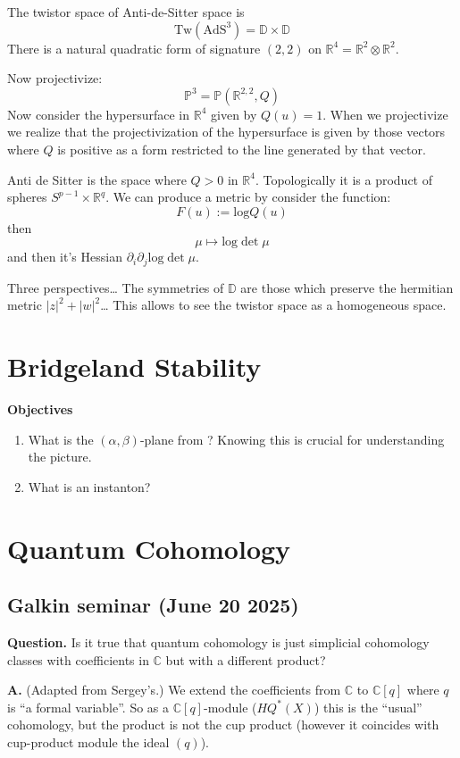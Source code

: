 The twistor space of Anti-de-Sitter space is
$$
\text{Tw}(\text{AdS}^3)=\mathbb{D}\times \mathbb{D}
$$
There is a natural quadratic form of signature $(2,2)$ on
$\mathbb{R}^4=\mathbb{R}^2 \otimes \mathbb{R}^2$. 

Now projectivize:
$$
\mathbb{P}^3=\mathbb{P}(\mathbb{R}^{2,2},Q)
$$
Now consider the hypersurface in $\mathbb{R}^4$ given by $Q(u)=1$. When we
projectivize we realize that the projectivization of the hypersurface is given
by those vectors where $Q$ is positive as a form restricted to the line
generated by that vector.

Anti de Sitter is the space where $Q>0$ in $\mathbb{R}^4$. Topologically it is a
product of spheres $S^{p-1}\times \mathbb{R}^q$. We can produce a metric by
consider the function:
$$
F(u):=\text{log}Q(u)
$$
then
$$
\mu \mapsto  \text{log}\det\mu
$$
and then it's Hessian $\partial_i \partial_j \text{log}\det \mu$.

Three perspectives… The symmetries of $\mathbb{D}$ are those which preserve the
 hermitian metric $|z|^2+|w|^2$… This allows to see the twistor space
 as a homogeneous space.

\section{Bridgeland Stability}
\label{section-Bridgeland-stability}

{\bf Objectives}
\begin{enumerate}
\item What is the $(\alpha,\beta)$-plane from \cite{wall-crossing}? Knowing this
is crucial for understanding the picture.
\item What is an instanton?
\end{enumerate}

\section{Quantum Cohomology}
\label{section-quantum-cohomology}

\subsection{Galkin seminar (June 20 2025)}
\label{subsection-Galkin-June-20}

{\bf Question.} Is it true that quantum cohomology is just simplicial cohomology
classes with coefficients in $\mathbb{C}$ but with a different product?

{\bf A.} (Adapted from Sergey's.) We extend the coefficients from $\mathbb{C}$
to $\mathbb{C}[q]$ where $q$ is ``a formal variable''. So as a
$\mathbb{C}[q]$-module ($HQ^*(X)$) this is the ``usual'' cohomology, but the
product is not the cup product (however it coincides with cup-product module the
ideal $(q)$).

